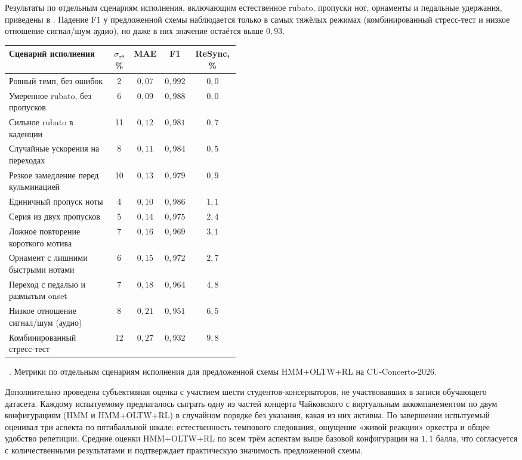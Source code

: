 Результаты по отдельным сценариям исполнения, включающим
естественное rubato, пропуски нот, орнаменты и педальные удержания,
приведены в . Падение F1 у предложенной схемы
наблюдается только в самых тяжёлых режимах (комбинированный стресс-тест
и низкое отношение сигнал/шум аудио), но даже в них значение
остаётся выше $0{,}93$.

\par\addvspace{2pt}
{\centering
{}%
\footnotesize
\begin{tabular}{@{}p{0.45\linewidth}cccc@{}}
  \toprule
  Сценарий исполнения                          & $\sigma_\tau$, \% & MAE & F1 & ReSync, \% \\
  \midrule
  Ровный темп, без ошибок                      & 2  & $0{,}07$ & $0{,}992$ & $0{,}0$ \\
  Умеренное rubato, без пропусков              & 6  & $0{,}09$ & $0{,}988$ & $0{,}0$ \\
  Сильное rubato в каденции                    & 11 & $0{,}12$ & $0{,}981$ & $0{,}7$ \\
  Случайные ускорения на переходах             & 8  & $0{,}11$ & $0{,}984$ & $0{,}5$ \\
  Резкое замедление перед кульминацией         & 10 & $0{,}13$ & $0{,}979$ & $0{,}9$ \\
  Единичный пропуск ноты                       & 4  & $0{,}10$ & $0{,}986$ & $1{,}1$ \\
  Серия из двух пропусков                      & 5  & $0{,}14$ & $0{,}975$ & $2{,}4$ \\
  Ложное повторение короткого мотива           & 7  & $0{,}16$ & $0{,}969$ & $3{,}1$ \\
  Орнамент с лишними быстрыми нотами           & 6  & $0{,}15$ & $0{,}972$ & $2{,}7$ \\
  Переход с педалью и размытым onset           & 7  & $0{,}18$ & $0{,}964$ & $4{,}8$ \\
  Низкое отношение сигнал/шум (аудио)          & 8  & $0{,}21$ & $0{,}951$ & $6{,}5$ \\
  Комбинированный стресс-тест                  & 12 & $0{,}27$ & $0{,}932$ & $9{,}8$ \\
  \bottomrule
\end{tabular}\par
\vspace{2pt}
\tablename~\thetable. Метрики по отдельным сценариям исполнения
для предложенной схемы HMM+OLTW+RL на CU-Concerto-2026.\par}
\addvspace{4pt}

Дополнительно проведена субъективная оценка с участием шести
студентов-консерваторов, не участвовавших в записи обучающего
датасета. Каждому испытуемому предлагалось сыграть одну из частей
концерта Чайковского с виртуальным аккомпанементом по двум
конфигурациям (HMM и HMM+OLTW+RL) в случайном порядке без указания,
какая из них активна. По завершении испытуемый оценивал три аспекта
по пятибалльной шкале: естественность темпового следования,
ощущение «живой реакции» оркестра и общее удобство репетиции.
Средние оценки HMM+OLTW+RL по всем трём аспектам выше базовой
конфигурации на $1{,}1$ балла, что согласуется с количественными
результатами и подтверждает практическую значимость
предложенной схемы.

